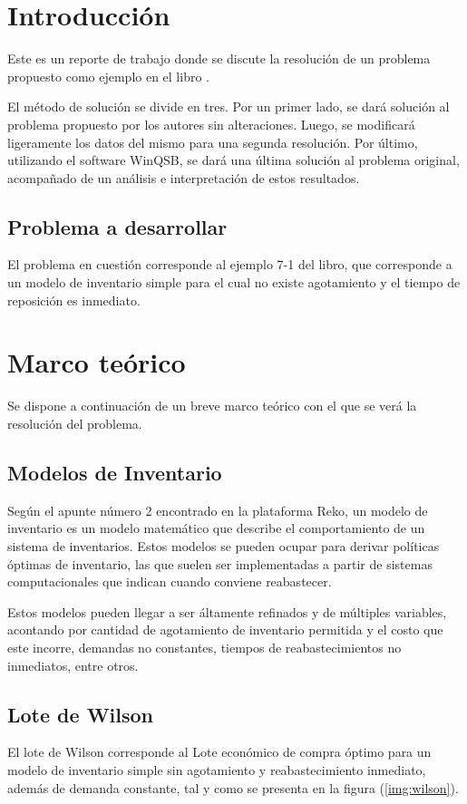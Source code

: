 \section{Introducción}
Este es un reporte de trabajo donde se discute la resolución de un problema propuesto como ejemplo en el libro \cite{acwinqsb}.

El método de solución se divide en tres. Por un primer lado, se dará solución al problema propuesto por los autores sin alteraciones. Luego, se modificará ligeramente los datos del mismo para una segunda resolución. Por último, utilizando el software WinQSB, se dará una última solución al problema original, acompañado de un análisis e interpretación de estos resultados.

\subsection{Problema a desarrollar}

El problema en cuestión corresponde al ejemplo 7-1 del libro, que corresponde a un modelo de inventario simple para el cual no existe agotamiento y el tiempo de reposición es inmediato.

\clearpage


\section{Marco teórico}
Se dispone a continuación de un breve marco teórico con el que se verá la resolución del problema.
\subsection{Modelos de Inventario}
Según el apunte número 2 encontrado en la plataforma Reko\cite{apunte}, un modelo de inventario es un modelo matemático que describe el comportamiento de un sistema de inventarios. Estos modelos se pueden ocupar para derivar políticas óptimas de inventario, las que suelen ser implementadas a partir de sistemas computacionales que indican cuando conviene reabastecer.

Estos modelos pueden llegar a ser áltamente refinados y de múltiples variables, acontando por cantidad de agotamiento de inventario permitida y el costo que este incorre, demandas no constantes, tiempos de reabastecimientos no inmediatos, entre otros.

\subsection{Lote de Wilson}
El lote de Wilson corresponde al Lote económico de compra óptimo para un modelo de inventario simple sin agotamiento y reabastecimiento inmediato, además de demanda constante, tal y como se presenta en la figura (\ref{img:wilson}).


